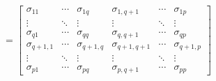 \[
=\begin{bmatrix}
\sigma_{11} & \cdots & \sigma_{1q} & \sigma_{1,q+1} & \cdots & \sigma_{1p}\\
\vdots & \ddots & \vdots & \vdots & \ddots & \vdots\\
\sigma_{q1} & \cdots & \sigma_{qq} & \sigma_{q,q+1} & \cdots & \sigma_{qp}\\
\sigma_{q+1,1} & \cdots & \sigma_{q+1,q} & \sigma_{q+1,q+1} & \cdots & \sigma_{q+1,p}\\
\vdots & \ddots & \vdots & \vdots & \ddots & \vdots\\
\sigma_{p1} & \cdots & \sigma_{pq} & \sigma_{p,q+1} & \cdots & \sigma_{pp}
\end{bmatrix}
\]
